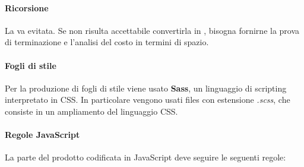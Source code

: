  \paragraph{Ricorsione}
 La  va evitata. Se non risulta accettabile convertirla in , bisogna fornirne la prova di terminazione e l'analisi del costo in termini di spazio.

 \paragraph{Fogli di stile}
 Per la produzione di fogli di stile viene usato \textbf{Sass}, un linguaggio di scripting interpretato in CSS. In particolare vengono usati files con estensione \textit{.scss}, che consiste in un ampliamento del linguaggio CSS.

\paragraph{Regole JavaScript}
La parte del prodotto codificata in JavaScript deve seguire le seguenti regole:
